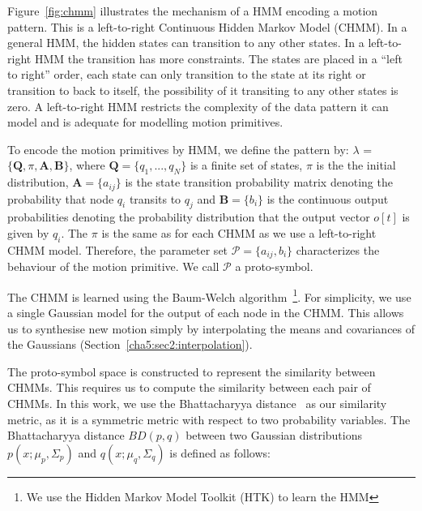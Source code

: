 Figure~\ref{fig:chmm} illustrates the mechanism of a HMM encoding a motion pattern. This is a left-to-right Continuous Hidden Markov Model (CHMM). In a general HMM, the hidden states can transition to any other states. In a left-to-right HMM the transition has more constraints. The states are placed in a ``left to right'' order, each state can only transition to the state at its right or transition to back to itself, the possibility of it transiting to any other states is zero. A left-to-right HMM restricts the complexity of the data pattern it can model and is adequate for modelling motion primitives.

To encode the motion primitives by HMM, we define the pattern by: $\lambda$ = $\{\boldsymbol{Q},\pi,\boldsymbol{A},\boldsymbol{B}\}$, where $\boldsymbol{Q}=\{q_1, ..., q_N\}$ is a finite set of states, $\pi$ is the the initial distribution, $\boldsymbol{A}=\{a_{ij}\}$ is the state transition probability matrix denoting the probability that node $q_i$ transits to $q_j$ and $\boldsymbol{B}=\{b_{i}\}$ is the continuous output probabilities denoting the probability distribution that the output vector $o[t]$ is given by $q_i$. The $\pi$ is the same as for each CHMM as we use a left-to-right CHMM model. Therefore, the parameter set $\mathcal{P} = \{a_{ij},b_i\}$ characterizes the behaviour of the motion primitive. We call $\mathcal{P}$ a proto-symbol.

The CHMM is learned using the Baum-Welch algorithm~\citep{rabiner1989tutorial}\footnote{We use the Hidden Markov Model Toolkit (HTK) to learn the HMM}.
For simplicity, we use a single Gaussian model for the output of each node in the CHMM. This allows us to synthesise new motion simply by interpolating the means and covariances of the Gaussians (Section~\ref{cha5:sec2:interpolation}).

The proto-symbol space is constructed to represent the similarity between CHMMs. This requires us to compute the similarity between each pair of CHMMs. In this work, we use the Bhattacharyya distance~\citep{kailath1967divergence} as our similarity metric, as it is a symmetric metric with respect to two probability variables. The Bhattacharyya distance $BD(p,q)$ between two Gaussian distributions $p(x;\mu_p,\Sigma_p)$ and $q(x;\mu_q,\Sigma_q)$ is defined as follows:


